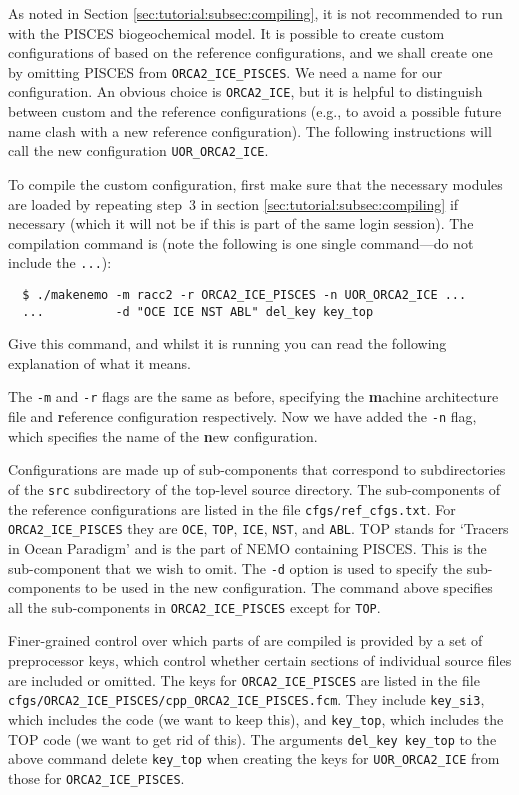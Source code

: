 As noted in Section \ref{sec:tutorial:subsec:compiling}, it is not recommended to run \SIcu{} with the PISCES biogeochemical model.
It is possible to create custom configurations of \NEMOSIcu{} based on the reference configurations, and we shall create one by omitting PISCES from \verb|ORCA2_ICE_PISCES|.
We need a name for our configuration.
An obvious choice is \verb|ORCA2_ICE|, but it is helpful to distinguish between custom and the reference configurations (e.g., to avoid a possible future name clash with a new reference configuration).
The following instructions will call the new configuration \verb|UOR_ORCA2_ICE|.

To compile the custom configuration, first make sure that the necessary modules are loaded by repeating step~3 in section \ref{sec:tutorial:subsec:compiling} if necessary (which it will not be if this is part of the same login session).
The compilation command is (note the following is one single command---do not include the \verb|...|):

\begingroup
\begin{verbatim}
  $ ./makenemo -m racc2 -r ORCA2_ICE_PISCES -n UOR_ORCA2_ICE ...
  ...          -d "OCE ICE NST ABL" del_key key_top
\end{verbatim}
\endgroup

Give this command, and whilst it is running you can read the following explanation of what it means.

The \verb|-m| and \verb|-r| flags are the same as before, specifying the \textbf{m}achine architecture file and \textbf{r}eference configuration respectively.
Now we have added the \verb|-n| flag, which specifies the name of the \textbf{n}ew configuration.

Configurations are made up of sub-components that correspond to subdirectories of the \verb|src| subdirectory of the top-level source directory.
The sub-components of the reference configurations are listed in the file \verb|cfgs/ref_cfgs.txt|.
For \verb|ORCA2_ICE_PISCES| they are \verb|OCE|, \verb|TOP|, \verb|ICE|, \verb|NST|, and \verb|ABL|.
TOP stands for `Tracers in Ocean Paradigm' and is the part of NEMO containing PISCES.
This is the sub-component that we wish to omit.
The \verb|-d| option is used to specify the sub-components to be used in the new configuration.
The command above specifies all the sub-components in \verb|ORCA2_ICE_PISCES| except for \verb|TOP|.

Finer-grained control over which parts of \NEMOSIcu{} are compiled is provided by a set of preprocessor keys, which control whether certain sections of individual source files are included or omitted.
The keys for \verb|ORCA2_ICE_PISCES| are listed in the file \verb|cfgs/ORCA2_ICE_PISCES/cpp_ORCA2_ICE_PISCES.fcm|.
They include \verb|key_si3|, which includes the \SIcu{} code (we want to keep this), and \verb|key_top|, which includes the TOP code (we want to get rid of this).
The arguments \verb|del_key key_top| to the above command delete \verb|key_top| when creating the keys for \verb|UOR_ORCA2_ICE| from those for \verb|ORCA2_ICE_PISCES|.


